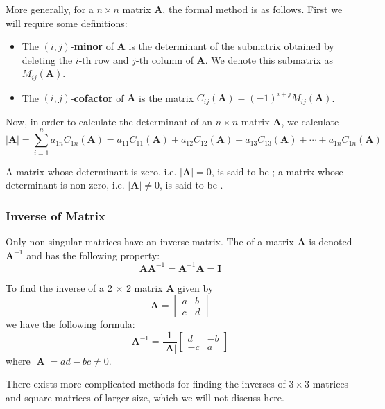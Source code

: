 More generally, for a $n \times n$ matrix $\mathbf{A}$, the formal method is as follows. First we will require some definitions:
\begin{itemize}
\item The $(i,j)$-\textbf{minor} of $\mathbf{A}$ is the determinant of the submatrix obtained by deleting the $i$-th row and $j$-th column of $\mathbf{A}$. We denote this submatrix as $M_{ij}(\mathbf{A})$.
\item The $(i,j)$-\textbf{cofactor} of $\mathbf{A}$ is the matrix $C_{ij}(\mathbf{A})=(-1)^{i+j}M_{ij}(\mathbf{A})$.
\end{itemize}
Now, in order to calculate the determinant of an $n \times n$ matrix $\mathbf{A}$, we calculate
\begin{equation}
|\mathbf{A}| = \sum_{i=1}^n a_{1n}C_{1n}(\mathbf{A}) = a_{11}C_{11}(\mathbf{A}) + a_{12}C_{12}(\mathbf{A}) + a_{13}C_{13}(\mathbf{A}) + \cdots + a_{1n}C_{1n}(\mathbf{A})
\end{equation}

A matrix whose determinant is zero, i.e. $|\mathbf{A}| = 0$, is said to be ; a matrix whose determinant is non-zero, i.e. $|\mathbf{A}| \neq 0$, is said to be .

\subsubsection{Inverse of Matrix}
Only non-singular matrices have an inverse matrix. The  of a matrix $\mathbf{A}$ is denoted $\mathbf{A}^{-1}$ and has the following property:
\begin{equation}
\mathbf{AA}^{-1} = \mathbf{A}^{-1}\mathbf{A} = \mathbf{I}
\end{equation}

To find the inverse of a 2 × 2 matrix $\mathbf{A}$ given by
\[ \mathbf{A} = \begin{bmatrix}
    a & b \\
    c & d
\end{bmatrix} \]
we have the following formula:
\begin{equation}
\mathbf{A}^{-1} = \frac{1}{|\mathbf{A}|}\begin{bmatrix} d & -b \\ -c & a \end{bmatrix}
\end{equation}
where $|\mathbf{A}|=ad-bc\neq0$.

\begin{remark}
There exists more complicated methods for finding the inverses of $3 \times 3$ matrices and square matrices of larger size, which we will not discuss here.
\end{remark}

